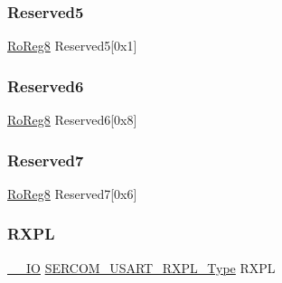 \mbox{\label{struct_sercom_usart_a7321f81c873f0c6c846004e246ac204d}} 
\subsubsection{\texorpdfstring{Reserved5}{Reserved5}}
{\footnotesize\ttfamily \mbox{\hyperlink{group___s_a_m_d21_e15_a__definitions_ga0d957f1433aaf5d70e4dc2b68288442d}{Ro\+Reg8}} Reserved5\mbox{[}0x1\mbox{]}}

\mbox{\label{struct_sercom_usart_a6c79c87b5bf6d0b4a196f3f6840b82e5}} 
\subsubsection{\texorpdfstring{Reserved6}{Reserved6}}
{\footnotesize\ttfamily \mbox{\hyperlink{group___s_a_m_d21_e15_a__definitions_ga0d957f1433aaf5d70e4dc2b68288442d}{Ro\+Reg8}} Reserved6\mbox{[}0x8\mbox{]}}

\mbox{\label{struct_sercom_usart_a5891c237f5fdeda00422d34c05413f62}} 
\subsubsection{\texorpdfstring{Reserved7}{Reserved7}}
{\footnotesize\ttfamily \mbox{\hyperlink{group___s_a_m_d21_e15_a__definitions_ga0d957f1433aaf5d70e4dc2b68288442d}{Ro\+Reg8}} Reserved7\mbox{[}0x6\mbox{]}}

\mbox{\label{struct_sercom_usart_a0fec254c3c796a331d3ee653dc9e48a3}} 
\subsubsection{\texorpdfstring{RXPL}{RXPL}}
{\footnotesize\ttfamily \mbox{\hyperlink{core__cm0plus_8h_aec43007d9998a0a0e01faede4133d6be}{\+\_\+\+\_\+\+IO}} \mbox{\hyperlink{union_s_e_r_c_o_m___u_s_a_r_t___r_x_p_l___type}{S\+E\+R\+C\+O\+M\+\_\+\+U\+S\+A\+R\+T\+\_\+\+R\+X\+P\+L\+\_\+\+Type}} R\+X\+PL}




